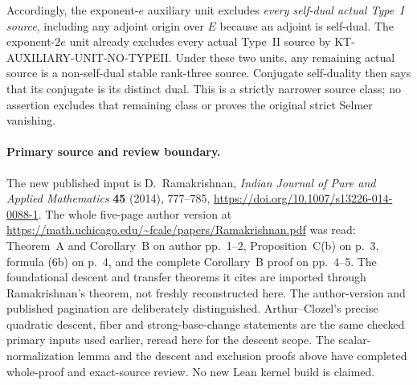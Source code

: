 Accordingly, the exponent-$e$ auxiliary unit excludes
\emph{every self-dual actual Type~I source}, including any
adjoint origin over $E$ because an adjoint is self-dual.
The exponent-$2e$ unit already excludes every actual Type~II
source by KT-AUXILIARY-UNIT-NO-TYPEII.
Under these two units, any remaining actual source is a
non-self-dual stable rank-three source.  Conjugate self-duality
then says that its conjugate is its distinct dual.  This is a
strictly narrower source class; no assertion excludes that
remaining class or proves the original strict Selmer vanishing.

\paragraph{Primary source and review boundary.}
The new published input is D.~Ramakrishnan, \emph{Indian Journal
of Pure and Applied Mathematics} \textbf{45} (2014), 777--785,
\url{https://doi.org/10.1007/s13226-014-0088-1}.
The whole five-page author version at
\url{https://math.uchicago.edu/~fcale/papers/Ramakrishnan.pdf}
was read: Theorem~A and Corollary~B on author pp.~1--2,
Proposition~C(b) on p.~3, formula (6b) on p.~4, and the
complete Corollary~B proof on pp.~4--5.  The foundational
descent and transfer theorems it cites are imported through
Ramakrishnan's theorem, not freshly reconstructed here.
The author-version and published pagination are deliberately
distinguished.  Arthur--Clozel's precise quadratic descent,
fiber and strong-base-change statements are the same checked
primary inputs used earlier, reread here for the descent scope.
The scalar-normalization lemma and the descent and exclusion
proofs above have completed whole-proof and exact-source review.
No new Lean kernel build is claimed.
